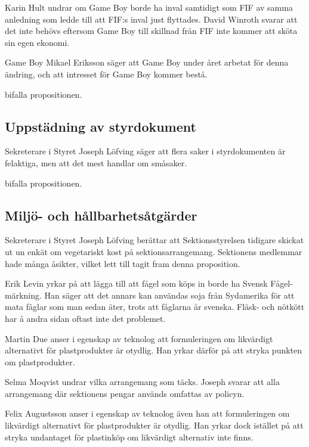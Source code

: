 \documentclass[hidelinks]{sektionsmote}
\begin{document}
Karin Hult undrar om Game Boy borde ha inval samtidigt som FIF av samma anledning som ledde till att FIF:s inval just flyttades.
David Winroth svarar att det inte behövs eftersom Game Boy till skillnad från FIF inte kommer att sköta sin egen ekonomi.

Game Boy Mikael Eriksson säger att Game Boy under året arbetat för denna ändring, och att intresset för Game Boy kommer bestå.

\begin{beslut}
  \item bifalla propositionen.
\end{beslut}


\subsection{Uppstädning av styrdokument}
Sekreterare i Styret Joseph Löfving säger att flera saker i styrdokumenten är felaktiga, men att det mest handlar om småsaker.

\begin{beslut}
  \item bifalla propositionen.
\end{beslut}


\subsection{Miljö- och hållbarhetsåtgärder}
Sekreterare i Styret Joseph Löfving berättar att Sektionsstyrelsen tidigare skickat ut un enkät om vegetariskt kost på sektionsarrangemang.
Sektionens medlemmar hade många åsikter, vilket lett till tagit fram denna proposition.

Erik Levin yrkar på att lägga till att fågel som köps in borde ha Svensk Fågel-märkning.
Han säger att det annars kan användas soja från Sydamerika för att mata fåglar som man sedan äter, trots att fåglarna är svenska.
Fläsk- och nötkött har å andra sidan oftast inte det problemet.

Martin Due anser i egenskap av teknolog att formuleringen om likvärdigt alternativt för plastprodukter är otydlig.
Han yrkar därför på att stryka punkten om plastprodukter.

Selma Moqvist undrar vilka arrangemang som täcks.
Joseph svarar att alla arrangemang där sektionens pengar används omfattas av policyn.

Felix Augustsson anser i egenskap av teknolog även han att formuleringen om likvärdigt alternativt för plastprodukter är otydlig.
Han yrkar dock istället på att stryka undantaget för plastinköp om likvärdigt alternativ inte finns.
\end{document}
